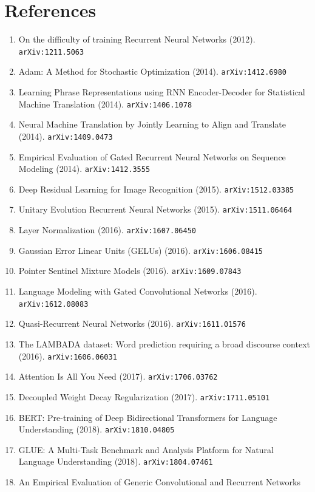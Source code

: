 \documentclass[11pt]{article}
\begin{document}
\section*{References}
\begin{enumerate}\small
  \item On the difficulty of training Recurrent Neural Networks (2012). \texttt{arXiv:1211.5063}
  \item Adam: A Method for Stochastic Optimization (2014). \texttt{arXiv:1412.6980}
  \item Learning Phrase Representations using RNN Encoder-Decoder for
  Statistical Machine Translation (2014). \texttt{arXiv:1406.1078}
  \item Neural Machine Translation by Jointly Learning to Align and Translate (2014). \texttt{arXiv:1409.0473}
  \item Empirical Evaluation of Gated Recurrent Neural Networks on Sequence
  Modeling (2014). \texttt{arXiv:1412.3555}
  \item Deep Residual Learning for Image Recognition (2015). \texttt{arXiv:1512.03385}
  \item Unitary Evolution Recurrent Neural Networks (2015). \texttt{arXiv:1511.06464}
  \item Layer Normalization (2016). \texttt{arXiv:1607.06450}
  \item Gaussian Error Linear Units (GELUs) (2016). \texttt{arXiv:1606.08415}
  \item Pointer Sentinel Mixture Models (2016). \texttt{arXiv:1609.07843}
  \item Language Modeling with Gated Convolutional Networks (2016). \texttt{arXiv:1612.08083}
  \item Quasi-Recurrent Neural Networks (2016). \texttt{arXiv:1611.01576}
  \item The LAMBADA dataset: Word prediction requiring a broad discourse context (2016). \texttt{arXiv:1606.06031}
  \item Attention Is All You Need (2017). \texttt{arXiv:1706.03762}
  \item Decoupled Weight Decay Regularization (2017). \texttt{arXiv:1711.05101}
  \item BERT: Pre-training of Deep Bidirectional Transformers for Language
  Understanding (2018). \texttt{arXiv:1810.04805}
  \item GLUE: A Multi-Task Benchmark and Analysis Platform for Natural Language
  Understanding (2018). \texttt{arXiv:1804.07461}
  \item An Empirical Evaluation of Generic Convolutional and Recurrent Networks

\end{enumerate}
\end{document}
